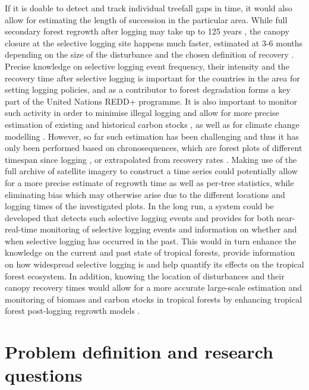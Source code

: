 \documentclass[a4paper,12pt]{scrbook}
\begin{document}
If it is doable to detect and track individual treefall gaps in time, it would also allow for estimating the length of succession in the particular area. While full secondary forest regrowth after logging may take up to 125 years \citep{rutishauser_tree_2016}, the canopy closure at the selective logging site happens much faster, estimated at 3-6 months depending on the size of the disturbance and the chosen definition of recovery \citep{broadbent_recovery_2006}. Precise knowledge on selective logging event frequency, their intensity and the recovery time after selective logging is important for the countries in the area for setting logging policies, and as a contributor to forest degradation forms a key part of the United Nations \ac{REDD+} programme. It is also important to monitor such activity in order to minimise illegal logging and allow for more precise estimation of existing and historical carbon stocks \citep{piponiot_carbon_2016, pinard_simulated_2000}, as well as for climate change modelling \citep{rutishauser_rapid_2015}. However, so far such estimation has been challenging \citep{piponiot_carbon_2016} and thus it has only been performed based on chronosequences, which are forest plots of different timespan since logging \citep{broadbent_recovery_2006}, or extrapolated from recovery rates \citep{rutishauser_rapid_2015}. Making use of the full archive of satellite imagery to construct a time series could potentially allow for a more precise estimate of regrowth time as well as per-tree statistics, while eliminating bias which may otherwise arise due to the different locations and logging times of the investigated plots. In the long run, a system could be developed that detects such selective logging events and provides for both near-real-time monitoring of selective logging events and information on whether and when selective logging has occurred in the past. This would in turn enhance the knowledge on the current and past state of tropical forests, provide information on how widespread selective logging is and help quantify its effects on the tropical forest ecosystem. In addition, knowing the location of disturbances and their canopy recovery times would allow for a more accurate large-scale estimation and monitoring of biomass and carbon stocks in tropical forests by enhancing tropical forest post-logging regrowth models \citep{herault_growth_2010}.

\chapter{Problem definition and research questions}
\end{document}
